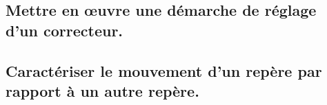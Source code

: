 \documentclass[10pt,fleqn]{book}
\newcommand{\repRel}{../..}
\newcommand{\repStyle}{\repRel/Style}
\newcommand{\td}{fichier_td}
\newcommand{\repExos}{\repRel/ExercicesCompetences}
\newcommand{\repExo}{dossier}
\begin{document}
\subsection{Mettre en œuvre une démarche de réglage d’un correcteur.} 

\begin{multicols}{2} 

\renewcommand{\repExo}{\repExos/C2_MettreEnOeuvreDemarche/C2_04_Correcteurs/65_Eclipse}
\renewcommand{\td}{65_Eclipse}
\graphicspath{{\repStyle/png/}{\repExo/images/}}


\renewcommand{\repExo}{\repExos/C2_MettreEnOeuvreDemarche/C2_04_Correcteurs/65_Eclipse_02}
\renewcommand{\td}{65_Eclipse_02}
\graphicspath{{\repStyle/png/}{\repExo/images/}}


\renewcommand{\repExo}{\repExos/C2_MettreEnOeuvreDemarche/C2_04_Correcteurs/65_Eclipse_03}
\renewcommand{\td}{65_Eclipse_03}
\graphicspath{{\repStyle/png/}{\repExo/images/}}


\renewcommand{\repExo}{\repExos/C2_MettreEnOeuvreDemarche/C2_04_Correcteurs/66_Micromanipulateur}
\renewcommand{\td}{66_Micromanipulateur}
\graphicspath{{\repStyle/png/}{\repExo/images/}}


\renewcommand{\repExo}{\repExos/C2_MettreEnOeuvreDemarche/C2_04_Correcteurs/67_PompeTurbo}
\renewcommand{\td}{67_PompeTurbo}
\graphicspath{{\repStyle/png/}{\repExo/images/}}


\renewcommand{\repExo}{\repExos/C2_MettreEnOeuvreDemarche/C2_04_Correcteurs/68_Roburoc}
\renewcommand{\td}{68_Roburoc}
\graphicspath{{\repStyle/png/}{\repExo/images/}}


\renewcommand{\repExo}{\repExos/C2_MettreEnOeuvreDemarche/C2_04_Correcteurs/70_Hublex}
\renewcommand{\td}{70_Hublex}
\graphicspath{{\repStyle/png/}{\repExo/images/}}


\end{multicols}

\subsection{Caractériser le mouvement d’un repère par rapport à un autre repère.} 

\begin{multicols}{2} 

\end{multicols}
\end{document}
